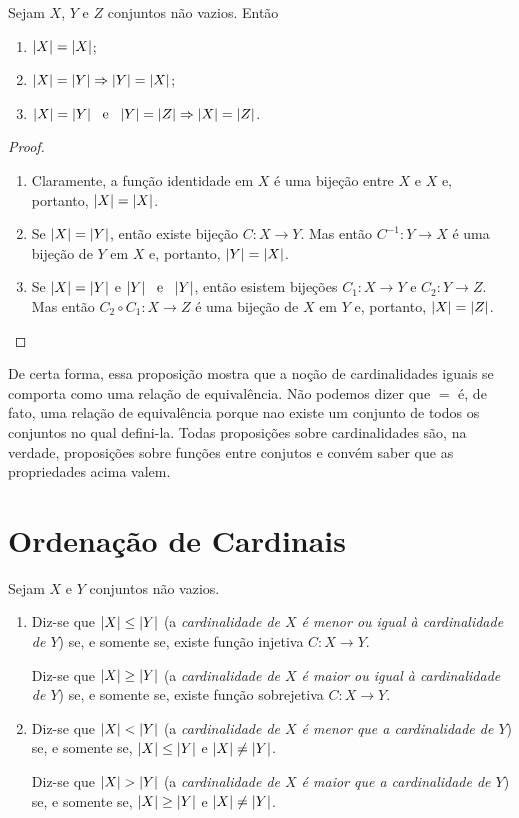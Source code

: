 \begin{prop}\label{conj:prop.card.rel.equiv}
	Sejam $X$, $Y$ e $Z$ conjuntos não vazios. Então
	\begin{enumerate}
	\item $\left\vert{X}\right\vert = \left\vert{X}\right\vert$;
	\item $\left\vert{X}\right\vert = \left\vert{Y}\right\vert \Rightarrow \left\vert{Y}\right\vert = \left\vert{X}\right\vert$;
	\item $\left\vert{X}\right\vert = \left\vert{Y}\right\vert \text{\ \ e\ \ } \left\vert{Y}\right\vert = \left\vert{Z}\right\vert \Rightarrow \left\vert{X}\right\vert = \left\vert{Z}\right\vert$.
	\end{enumerate}
\end{prop}
\begin{proof}
	\begin{enumerate}
	\item Claramente, a função identidade em $X$ é uma bijeção entre $X$ e $X$ e, portanto, $\left\vert{X}\right\vert = \left\vert{X}\right\vert$.
	\item Se $\left\vert{X}\right\vert = \left\vert{Y}\right\vert$, então existe bijeção $C: X \to Y$. Mas então $C^{-1}:Y \to X$ é uma bijeção de $Y$ em $X$ e, portanto, $\left\vert{Y}\right\vert = \left\vert{X}\right\vert$.
	\item Se $\left\vert{X}\right\vert = \left\vert{Y}\right\vert$ e $\left\vert{Y}\right\vert \text{\ \ e\ \ } \left\vert{Y}\right\vert$, então esistem bijeções $C_1: X \to Y$ e $C_2: Y \to Z$. Mas então $C_2 \circ C_1 : X \to Z$ é uma bijeção de $X$ em $Y$ e, portanto, $\left\vert{X}\right\vert = \left\vert{Z}\right\vert$.
	\end{enumerate}
\end{proof}

	De certa forma, essa proposição mostra que a noção de cardinalidades iguais se comporta como uma relação de equivalência. Não podemos dizer que $=$ é, de fato, uma relação de equivalência porque nao existe um conjunto de todos os conjuntos no qual defini-la. Todas proposições sobre cardinalidades são, na verdade, proposições sobre funções entre conjutos e convém saber que as propriedades acima valem.
	
\section{Ordenação de Cardinais}

\begin{defi}
	Sejam $X$ e $Y$ conjuntos não vazios.
	\begin{enumerate}
	\item Diz-se que $\left\vert{X}\right\vert \leq \left\vert{Y}\right\vert$ (a \emph{cardinalidade de $X$ é menor ou igual à cardinalidade de $Y$}) se, e somente se, existe função injetiva $C:X \to Y$.
	
	Diz-se que $\left\vert{X}\right\vert \geq \left\vert{Y}\right\vert$ (a \emph{cardinalidade de $X$ é maior ou igual à cardinalidade de $Y$}) se, e somente se, existe função sobrejetiva $C:X \to Y$.
	
	\item Diz-se que $\left\vert{X}\right\vert < \left\vert{Y}\right\vert$ (a \emph{cardinalidade de $X$ é menor que a cardinalidade de $Y$}) se, e somente se, $\left\vert{X}\right\vert \leq \left\vert{Y}\right\vert$ e $\left\vert{X}\right\vert \neq \left\vert{Y}\right\vert$.
	
	Diz-se que $\left\vert{X}\right\vert > \left\vert{Y}\right\vert$ (a \emph{cardinalidade de $X$ é maior que a cardinalidade de $Y$}) se, e somente se, $\left\vert{X}\right\vert \geq \left\vert{Y}\right\vert$ e $\left\vert{X}\right\vert \neq \left\vert{Y}\right\vert$.
	\end{enumerate}
\end{defi}

